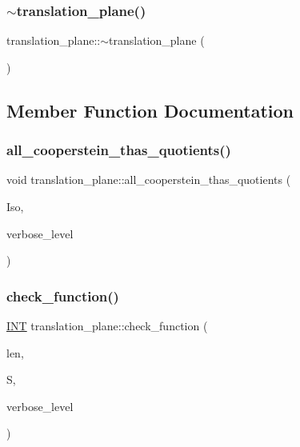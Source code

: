 \subsubsection{\texorpdfstring{$\sim$translation\+\_\+plane()}{~translation\_plane()}}
{\footnotesize\ttfamily translation\+\_\+plane\+::$\sim$translation\+\_\+plane (\begin{DoxyParamCaption}{ }\end{DoxyParamCaption})}



\subsection{Member Function Documentation}
\mbox{\label{classtranslation__plane_a04087117cd260f4a7e19e104585e6042}} 
\subsubsection{\texorpdfstring{all\+\_\+cooperstein\+\_\+thas\+\_\+quotients()}{all\_cooperstein\_thas\_quotients()}}
{\footnotesize\ttfamily void translation\+\_\+plane\+::all\+\_\+cooperstein\+\_\+thas\+\_\+quotients (\begin{DoxyParamCaption}\item[{\mbox{\hyperlink{classisomorph}{isomorph}} \&}]{Iso,  }\item[{\mbox{\hyperlink{galois_8h_a09fddde158a3a20bd2dcadb609de11dc}{I\+NT}}}]{verbose\+\_\+level }\end{DoxyParamCaption})}

\mbox{\label{classtranslation__plane_ae0485ff04ec676060a33991afa38d1e5}} 
\subsubsection{\texorpdfstring{check\+\_\+function()}{check\_function()}}
{\footnotesize\ttfamily \mbox{\hyperlink{galois_8h_a09fddde158a3a20bd2dcadb609de11dc}{I\+NT}} translation\+\_\+plane\+::check\+\_\+function (\begin{DoxyParamCaption}\item[{\mbox{\hyperlink{galois_8h_a09fddde158a3a20bd2dcadb609de11dc}{I\+NT}}}]{len,  }\item[{\mbox{\hyperlink{galois_8h_a09fddde158a3a20bd2dcadb609de11dc}{I\+NT}} $\ast$}]{S,  }\item[{\mbox{\hyperlink{galois_8h_a09fddde158a3a20bd2dcadb609de11dc}{I\+NT}}}]{verbose\+\_\+level }\end{DoxyParamCaption})}

